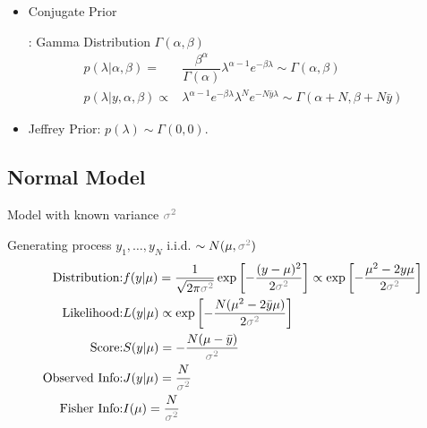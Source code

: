 \begin{itemize}[topsep=2pt,itemsep=0pt]
    \item \hypertarget{ExpConjugate}{Conjugate Prior}: Gamma Distribution $ \Gamma (\alpha ,\beta  ) $
    \begin{align*}
        p(\lambda|\alpha ,\beta  )=&\dfrac{ \beta ^\alpha   }{ \Gamma (\alpha ) }\lambda ^{\alpha -1}e^{-\beta  \lambda }\sim \Gamma (\alpha ,\beta  )  \\
        p(\lambda |y,\alpha ,\beta )\propto&\lambda ^{\alpha -1}e^{-\beta  \lambda }\lambda ^{N}e^{-N\bar{y}\lambda }\sim \Gamma (\alpha +N, \beta +N\bar{y})
    \end{align*}

    \item Jeffrey Prior: $ p(\lambda )\sim \Gamma (0 ,0) $. 
\end{itemize}

    



\subsection{Normal Model}\label{SubSubSectionBayesianNormal}
\begin{point}
    Model with known variance $ \fixed{\sigma ^2} $
\end{point}

Generating process $ y_1,\ldots,y_N $ i.i.d. $ \sim N(\mu ,\fixed{\sigma ^2}) $
\begin{align*}
    \text{Distribution:}&f(y|\mu  )=\dfrac{1}{\sqrt{2\pi\fixed{\sigma^2}}}\exp\left[ -\dfrac{(y-\mu )^2}{2\fixed{\sigma ^2}} \right]\propto \exp\left[ -\dfrac{\mu ^2-2y\mu }{2\fixed{\sigma ^2}} \right]\\
    \text{Likelihood:}&L( y|\mu)\propto  \exp\left[ -\dfrac{N(\mu ^2-2\bar{y}\mu) }{2\fixed{\sigma ^2}} \right] \\
    \text{Score:}&S(y|\mu)= -\dfrac{N(\mu -\bar{y})}{\fixed{\sigma ^2}}\\
    \text{Observed Info:}&J(y|\mu)=\dfrac{N}{\fixed{\sigma ^2}}\\
    \text{Fisher Info:}&I(\mu  )=\dfrac{N}{\fixed{\sigma ^2} }
\end{align*}


